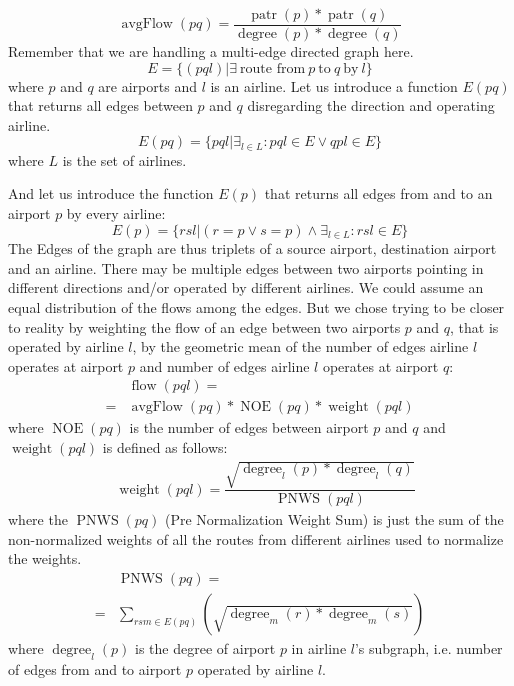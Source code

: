 \documentclass[twocolumn]{tum-article}
\DeclareMathOperator{\avgFlow}{avgFlow}
\DeclareMathOperator{\patronage}{patr}
\DeclareMathOperator{\flow}{flow}
\DeclareMathOperator{\weight}{weight}
\DeclareMathOperator{\PNWS}{PNWS}
\DeclareMathOperator{\NOE}{NOE}
\DeclareMathOperator{\degree}{degree}
\begin{document}
\begin{equation}
\avgFlow(pq) = \dfrac{\patronage(p) * \patronage(q)}{\degree(p) * \degree(q)}
\end{equation}
Remember that we are handling a multi-edge directed graph here. 
\begin{equation}
E = \{(pql) | \exists\ \text{route from}\ p\ \text{to}\ q\ \text{by}\ l\}
\end{equation}
where $p$ and $q$ are airports and $l$ is an airline.
Let us introduce a function $E(pq)$ that returns all edges between $p$ and $q$ disregarding the direction and operating airline. 
\begin{equation}
E(pq) = \{pql | \exists_{l \in L}:pql \in E \lor qpl \in E\}
\end{equation}
where $L$ is the set of airlines.

And let us introduce the function $E(p)$ that returns all edges from and to an airport $p$ by every airline: 
\begin{equation}
E(p) = \{rsl | (r=p \lor s=p) \land \exists_{l \in L}:rsl \in E \}
\end{equation}
The Edges of the graph are thus triplets of a source airport, destination airport and an airline.
There may be multiple edges between two airports pointing in different directions and/or operated by different airlines.
We could assume an equal distribution of the flows among the edges. But we chose trying to be closer to reality by weighting the flow of an edge between two airports $p$ and $q$, that is operated by airline $l$, by the geometric mean of the number of edges airline $l$ operates at airport $p$ and number of edges airline $l$ operates at airport $q$: 
\begin{equation}
\begin{aligned}
&\flow(pql) =\\
={}&\avgFlow(pq)  
* \NOE(pq) 
* \weight(pql) 
\end{aligned}
\end{equation}
where $\NOE(pq)$ is the number of edges between airport $p$ and $q$ and $\weight(pql)$ is defined as follows: 
\begin{equation}
\begin{aligned}
&\weight(pql) = \dfrac{\sqrt{\degree_{l}(p) * \degree_{l}(q)}}{\PNWS(pql)}
\end{aligned}
\end{equation}
where the $\PNWS(pq)$ (Pre Normalization Weight Sum) is just the sum of the non-normalized weights of all the routes from different airlines used to normalize the weights. 
\begin{equation}
\begin{aligned}
&\PNWS(pq) = \\
={}&\displaystyle\sum_{rsm \in E(pq)}(\sqrt{\degree_{m}(r) * \degree_{m}(s)})
\end{aligned}
\end{equation}
where $\degree_l(p)$ is the degree of airport $p$ in airline $l$'s subgraph, i.e. number of edges from and to airport $p$ operated by airline $l$.
\end{document}
